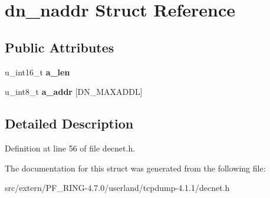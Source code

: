 \hypertarget{structdn__naddr}{
\section{dn\_\-naddr Struct Reference}
\label{structdn__naddr}
}
\subsection*{Public Attributes}
\begin{DoxyCompactItemize}
\item 
\hypertarget{structdn__naddr_a5f428de11482d2878ba7a9dc55f18d2b}{
u\_\-int16\_\-t {\bfseries a\_\-len}}
\label{structdn__naddr_a5f428de11482d2878ba7a9dc55f18d2b}

\item 
\hypertarget{structdn__naddr_aabc9d04b5c5402309fc952c122d71351}{
u\_\-int8\_\-t {\bfseries a\_\-addr} \mbox{[}DN\_\-MAXADDL\mbox{]}}
\label{structdn__naddr_aabc9d04b5c5402309fc952c122d71351}

\end{DoxyCompactItemize}


\subsection{Detailed Description}


Definition at line 56 of file decnet.h.



The documentation for this struct was generated from the following file:\begin{DoxyCompactItemize}
\item 
src/extern/PF\_\-RING-\/4.7.0/userland/tcpdump-\/4.1.1/decnet.h\end{DoxyCompactItemize}
